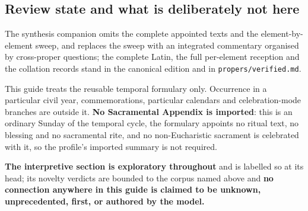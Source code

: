 \subsection*{Review state and what is deliberately not here}

The synthesis companion omits the complete appointed texts and the
element-by-element sweep, and replaces the sweep with an integrated commentary
organised by cross-proper questions; the complete Latin, the full per-element
reception and the collation records stand in the canonical edition and in
\texttt{propers/verified.md}.

This guide treats the reusable temporal formulary only. Occurrence in a
particular civil year, commemorations, particular calendars and celebration-mode
branches are outside it. \textbf{No Sacramental Appendix is imported}: this is
an ordinary Sunday of the temporal cycle, the formulary appoints no ritual text,
no blessing and no sacramental rite, and no non-Eucharistic sacrament is
celebrated with it, so the profile's imported summary is not required.

\textbf{The interpretive section is exploratory throughout} and is labelled so
at its head; its novelty verdicts are bounded to the corpus named above and
\textbf{no connection anywhere in this guide is claimed to be unknown,
unprecedented, first, or authored by the model.}

\clearpage
